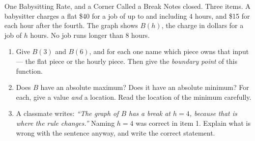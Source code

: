 \documentclass[10pt]{article}
\begin{document}

\vspace{0.15in}

\begin{notesbox}{One Babysitting Rate, and a Corner Called a Break}
\small
Notes closed. Three items. A babysitter charges a flat \$40 for a job of up to and including $4$
hours, and \$15 for each hour after the fourth. The graph shows $B(h)$, the charge in dollars for a
job of $h$ hours. No job runs longer than $8$ hours.

\begin{center}
\end{center}

\begin{enumerate}[leftmargin=1.6em, itemsep=7pt, topsep=4pt]

\item Give $B(3)$ and $B(6)$, and for each one name which piece owns that input --- the flat piece or
the hourly piece. Then give the \emph{boundary point} of this function.


\item Does $B$ have an absolute maximum? Does it have an absolute minimum? For each, give a value
\emph{and} a location. Read the location of the minimum carefully.


\item A classmate writes: \emph{``The graph of $B$ has a break at $h=4$, because that is where the
rule changes.''} Naming $h=4$ was correct in item 1. Explain what is wrong with the sentence anyway,
and write the correct statement.


\end{enumerate}
\end{notesbox}
\end{document}
